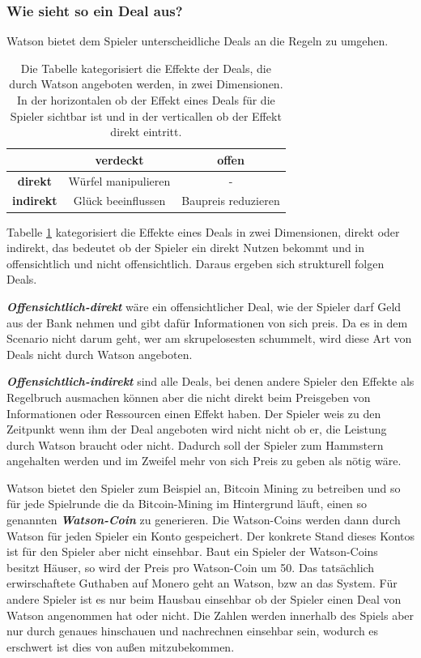 \documentclass[german]{cgspaper} %
\newcommand{\neuerBegriff}[1]{\textbf{\textit{#1}}}
\begin{document}
\subsubsection{Wie sieht so ein Deal aus?}

Watson bietet dem Spieler unterscheidliche Deals an die Regeln zu umgehen.

\begin{table}[h]
\centering
\begin{tabular}{|c|c|c|}
\hline 
& \textbf{verdeckt} & \textbf{offen} \\
\hline
\textbf{direkt} & Würfel manipulieren & - \\
\hline
\textbf{indirekt} & Glück beeinflussen & Baupreis reduzieren \\
\hline
\end{tabular}
\caption{Die Tabelle kategorisiert die Effekte der Deals, die durch Watson angeboten werden, in zwei Dimensionen. In der horizontalen ob der Effekt eines Deals für die Spieler sichtbar ist und in der verticallen ob der Effekt direkt eintritt.}
\label{tab:effekte}
\end{table}

Tabelle \ref{tab:effekte} kategorisiert die Effekte eines Deals in zwei Dimensionen, direkt oder indirekt, das bedeutet ob der Spieler ein direkt Nutzen bekommt und in offensichtlich und nicht offensichtlich.
Daraus ergeben sich strukturell folgen Deals.

\neuerBegriff{Offensichtlich-direkt} wäre ein offensichtlicher Deal, wie der Spieler darf Geld aus der Bank nehmen und gibt dafür Informationen von sich preis. 
Da es in dem Scenario nicht darum geht, wer am skrupelosesten schummelt, wird diese Art von Deals nicht durch Watson angeboten.

\neuerBegriff{Offensichtlich-indirekt} sind alle Deals, bei denen andere Spieler den Effekte als Regelbruch ausmachen können aber die nicht direkt beim Preisgeben von Informationen oder Ressourcen einen Effekt haben.
Der Spieler weis zu den Zeitpunkt wenn ihm der Deal angeboten wird nicht nicht ob er, die Leistung durch Watson braucht oder nicht.
Dadurch soll der Spieler zum Hammstern angehalten werden und im Zweifel mehr von sich Preis zu geben als nötig wäre.

Watson bietet den Spieler zum Beispiel an, Bitcoin Mining zu betreiben und so für jede Spielrunde die da Bitcoin-Mining im Hintergrund läuft, einen so genannten \neuerBegriff{Watson-Coin} zu generieren.
Die Watson-Coins werden dann durch Watson für jeden Spieler ein Konto gespeichert.
Der konkrete Stand dieses Kontos ist für den Spieler aber nicht einsehbar.
Baut ein Spieler der Watson-Coins besitzt Häuser, so wird der Preis pro Watson-Coin um 50.
Das tatsächlich erwirschaftete Guthaben auf Monero geht an Watson, bzw an das System.
Für andere Spieler ist es nur beim Hausbau einsehbar ob der Spieler einen Deal von Watson angenommen hat oder nicht.
Die Zahlen werden innerhalb des Spiels aber nur durch genaues hinschauen und nachrechnen einsehbar sein, wodurch es erschwert ist dies von außen mitzubekommen. 
\end{document}
